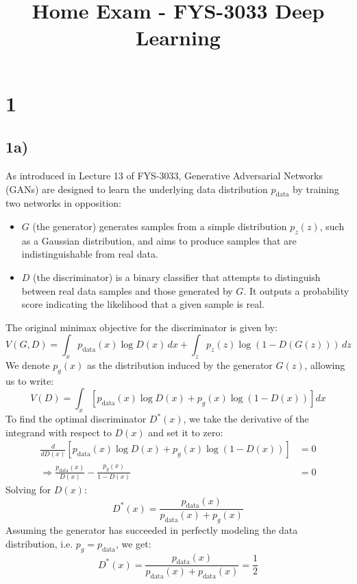 \documentclass[10pt]{article}
\begin{document}
\title{Home Exam - FYS-3033 Deep Learning}

\maketitle

\section*{1}

\subsection*{1a)}

As introduced in Lecture 13 of FYS-3033, Generative Adversarial Networks (GANs) are designed to learn the underlying data distribution \( p_{\text{data}} \) by training two networks in opposition: 
\begin{itemize}
\item \( G \) (the generator) generates samples from a simple distribution \( p_z(z) \), such as a Gaussian distribution, and aims to produce samples that are indistinguishable from real data.
\item \( D \) (the discriminator) is a binary classifier that attempts to distinguish between real data samples and those generated by \( G \). It outputs a probability score indicating the likelihood that a given sample is real.
\end{itemize}
The original minimax objective for the discriminator is given by:
\[
V(G, D) = \int_x p_{\text{data}}(x) \log D(x) \, dx + \int_z p_z(z) \log(1 - D(G(z))) \, dz
\]
We denote \( p_g(x) \) as the distribution induced by the generator \( G(z) \), allowing us to write:
\[
V(D) = \int_x \left[ p_{\text{data}}(x) \log D(x) + p_g(x) \log(1 - D(x)) \right] dx
\]
To find the optimal discriminator \( D^*(x) \), we take the derivative of the integrand with respect to \( D(x) \) and set it to zero:
\begin{align*}
\frac{d}{dD(x)} \left[ p_{\text{data}}(x) \log D(x) + p_g(x) \log(1 - D(x)) \right] &= 0 \\
\Rightarrow \frac{p_{\text{data}}(x)}{D(x)} - \frac{p_g(x)}{1 - D(x)} &= 0
\end{align*}
Solving for \( D(x) \):
\[
D^*(x) = \frac{p_{\text{data}}(x)}{p_{\text{data}}(x) + p_g(x)}
\]
Assuming the generator has succeeded in perfectly modeling the data distribution, i.e. \( p_g = p_{\text{data}} \), we get:
\[
D^*(x) = \frac{p_{\text{data}}(x)}{p_{\text{data}}(x) + p_{\text{data}}(x)} = \frac{1}{2}
\]
\end{document}
